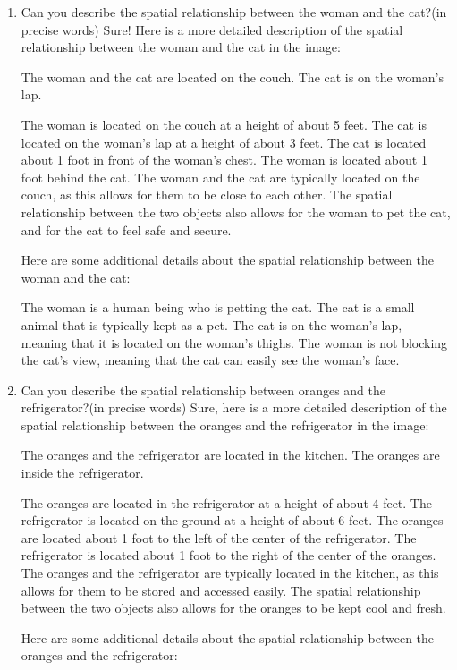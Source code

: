 \begin{enumerate}
    \item Can you describe the spatial relationship between the woman and the cat?(in precise words)
    \subitem 
    Sure! Here is a more detailed description of the spatial relationship between the woman and the cat in the image:
    
    The woman and the cat are located on the couch. The cat is on the woman's lap.
    
    The woman is located on the couch at a height of about 5 feet.
    The cat is located on the woman's lap at a height of about 3 feet.
    The cat is located about 1 foot in front of the woman's chest.
    The woman is located about 1 foot behind the cat.
    The woman and the cat are typically located on the couch, as this allows for them to be close to each other. The spatial relationship between the two objects also allows for the woman to pet the cat, and for the cat to feel safe and secure.
    
    Here are some additional details about the spatial relationship between the woman and the cat:
    
    The woman is a human being who is petting the cat.
    The cat is a small animal that is typically kept as a pet.
    The cat is on the woman's lap, meaning that it is located on the woman's thighs.
    The woman is not blocking the cat's view, meaning that the cat can easily see the woman's face.
    \item Can you describe the spatial relationship between oranges and the refrigerator?(in precise words)
    \subitem 
    Sure, here is a more detailed description of the spatial relationship between the oranges and the refrigerator in the image:
    
    The oranges and the refrigerator are located in the kitchen. The oranges are inside the refrigerator.
    
    The oranges are located in the refrigerator at a height of about 4 feet.
    The refrigerator is located on the ground at a height of about 6 feet.
    The oranges are located about 1 foot to the left of the center of the refrigerator.
    The refrigerator is located about 1 foot to the right of the center of the oranges.
    The oranges and the refrigerator are typically located in the kitchen, as this allows for them to be stored and accessed easily. The spatial relationship between the two objects also allows for the oranges to be kept cool and fresh.
    
    Here are some additional details about the spatial relationship between the oranges and the refrigerator:
    

\end{enumerate}
